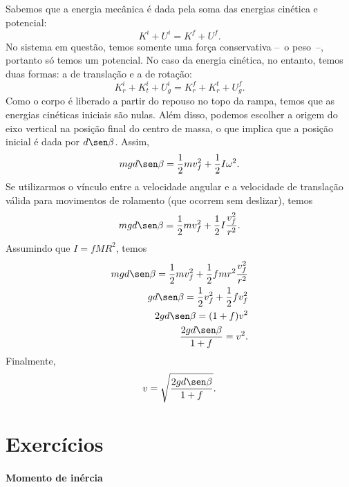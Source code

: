 Sabemos que a energia mecânica é dada pela soma das energias cinética e potencial:
\begin{equation}
    K^i + U^i = K^f + U^f.
\end{equation}
%
No sistema em questão, temos somente uma força conservativa --~o peso~--, portanto só temos um potencial. No caso da energia cinética, no entanto, temos duas formas: a de translação e a de rotação:
\begin{equation}
    K_r^i + K_t^i + U_g^i = K_r^f + K_r^t + U_g^f.
\end{equation}
%
Como o corpo é liberado a partir do repouso no topo da rampa, temos que as energias cinéticas iniciais são nulas. Além disso, podemos escolher a origem do eixo vertical na posição final do centro de massa, o que implica que a posição inicial é dada por $d\sen\beta$. Assim,
\begin{equation}
    mgd\sen\beta = \frac{1}{2} mv_f^2 + \frac{1}{2} I\omega^2.
\end{equation}
%
Se utilizarmos o vínculo entre a velocidade angular e a velocidade de translação válida para movimentos de rolamento (que ocorrem sem deslizar), temos
\begin{equation}
    mgd\sen\beta = \frac{1}{2} mv_f^2 + \frac{1}{2} I \frac{v_f^2}{r^2}.
\end{equation}
%
Assumindo que $I = f MR^2$, temos
\begin{align}
    mgd\sen\beta = \frac{1}{2} mv_f^2 + \frac{1}{2} f mr^2 \frac{v_f^2}{r^2} \\
    gd\sen\beta = \frac{1}{2} v_f^2 + \frac{1}{2} f v_f^2 \\
    2gd\sen\beta = (1 + f) v^2 \\
    \frac{2gd\sen\beta}{1 + f} = v^2.
\end{align}
%
Finalmente,
\begin{equation}
    v = \sqrt{\frac{2gd\sen\beta}{1 + f}}.
\end{equation}

\section{Exercícios}

\paragraph{Momento de inércia}

